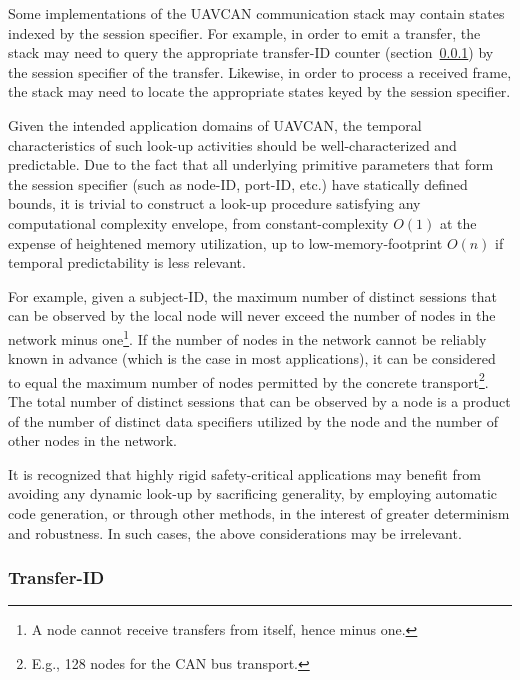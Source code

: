 \begin{remark}[breakable]
    Some implementations of the UAVCAN communication stack may contain states indexed by the session specifier.
    For example, in order to emit a transfer, the stack may need to query the appropriate transfer-ID counter
    (section~\ref{sec:transport_transfer_id}) by the session specifier of the transfer.
    Likewise, in order to process a received frame,
    the stack may need to locate the appropriate states keyed by the session specifier.

    Given the intended application domains of UAVCAN,
    the temporal characteristics of such look-up activities should be well-characterized and predictable.
    Due to the fact that all underlying primitive parameters that form the session specifier
    (such as node-ID, port-ID, etc.) have statically defined bounds,
    it is trivial to construct a look-up procedure satisfying any computational complexity envelope,
    from constant-complexity $O(1)$ at the expense of heightened memory utilization,
    up to low-memory-footprint $O(n)$ if temporal predictability is less relevant.

    For example, given a subject-ID, the maximum number of distinct sessions that can be observed
    by the local node will never exceed the number of nodes in the network minus one\footnote{%
        A node cannot receive transfers from itself, hence minus one.
    }.
    If the number of nodes in the network cannot be reliably known in advance (which is the case in most applications),
    it can be considered to equal the maximum number of nodes permitted by the concrete transport\footnote{%
        E.g., 128 nodes for the CAN bus transport.
    }.
    The total number of distinct sessions that can be observed by a node is a product of the number
    of distinct data specifiers utilized by the node and the number of other nodes in the network.

    It is recognized that highly rigid safety-critical applications may benefit from avoiding any
    dynamic look-up by sacrificing generality, by employing automatic code generation, or through other methods,
    in the interest of greater determinism and robustness.
    In such cases, the above considerations may be irrelevant.
\end{remark}

\subsubsection{Transfer-ID}\label{sec:transport_transfer_id}

